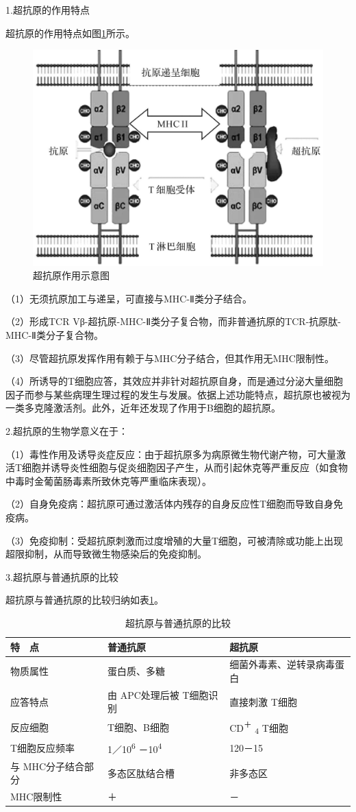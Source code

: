 1.超抗原的作用特点

超抗原的作用特点如图\ref{fig3-10}所示。

\begin{figure}[!htbp]
 \centering
 \includegraphics[width=.6\textwidth]{./images/Image00059.jpg}
 \captionsetup{justification=centering}
 \caption{超抗原作用示意图}
 \label{fig3-10}
  \end{figure}

（1）无须抗原加工与递呈，可直接与MHC-Ⅱ类分子结合。

（2）形成TCR
Vβ-超抗原-MHC-Ⅱ类分子复合物，而非普通抗原的TCR-抗原肽-MHC-Ⅱ类分子复合物。

（3）尽管超抗原发挥作用有赖于与MHC分子结合，但其作用无MHC限制性。

（4）所诱导的T细胞应答，其效应并非针对超抗原自身，而是通过分泌大量细胞因子而参与某些病理生理过程的发生与发展。依据上述功能特点，超抗原也被视为一类多克隆激活剂。此外，近年还发现了作用于B细胞的超抗原。

2.超抗原的生物学意义在于：

（1）毒性作用及诱导炎症反应：由于超抗原多为病原微生物代谢产物，可大量激活T细胞并诱导炎性细胞与促炎细胞因子产生，从而引起休克等严重反应（如食物中毒时金葡菌肠毒素所致休克等严重临床表现）。

（2）自身免疫病：超抗原可通过激活体内残存的自身反应性T细胞而导致自身免疫病。

（3）免疫抑制：受超抗原刺激而过度增殖的大量T细胞，可被清除或功能上出现超限抑制，从而导致微生物感染后的免疫抑制。

3.超抗原与普通抗原的比较

超抗原与普通抗原的比较归纳如表\ref{tab3-1}。

\begin{longtable}[]{@{}lll@{}}
    \caption{超抗原与普通抗原的比较}
    \label{tab3-1}\\
\toprule
特　点 & 普通抗原 & 超抗原\tabularnewline
\midrule
\endhead
物质属性 & 蛋白质、多糖 & 细菌外毒素、逆转录病毒蛋白\tabularnewline
应答特点 & 由 APC处理后被 T细胞识别 & 直接刺激 T细胞\tabularnewline
反应细胞 & T细胞、B细胞 & CD\textsuperscript{＋} \textsubscript{4}
T细胞\tabularnewline
T细胞反应频率 & 1／10\textsuperscript{6} －10\textsuperscript{4} &
120－15\tabularnewline
与 MHC分子结合部分 & 多态区肽结合槽 & 非多态区\tabularnewline
MHC限制性 & ＋ & －\tabularnewline
\bottomrule
\end{longtable}


